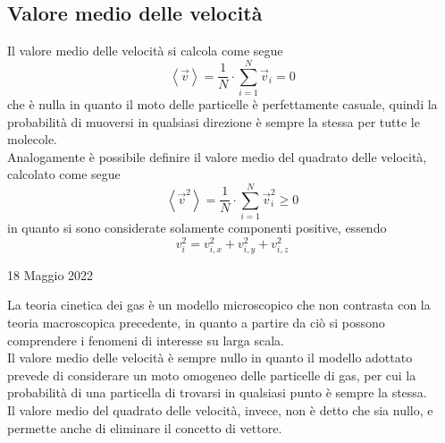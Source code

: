 \documentclass[a4paper]{extarticle}
\begin{document}
\vspace{1em}
\subsection{Valore medio delle velocità}
Il valore medio delle velocità si calcola come segue
\[\boxed{\left<\vec v\right> = \frac{1}{N} \cdot \sum_{i=1}^N \vec v_i = 0}\]
che è nulla in quanto il moto delle particelle è perfettamente casuale, quindi la probabilità di muoversi in qualsiasi direzione è sempre la stessa per tutte le molecole.\\
Analogamente è possibile definire il valore medio del quadrato delle velocità, calcolato come segue
\[\boxed{\left<\vec v^2\right> = \frac{1}{N} \cdot \sum_{i=1}^N \vec v_i^2 \geq 0}\]
in quanto si sono considerate solamente componenti positive, essendo
\[v_i^2 = v_{i,x}^2 + v_{i,y}^2 + v_{i,z}^2\]

\newpage
\noindent
\begin{center}
  18 Maggio 2022
\end{center}
La teoria cinetica dei gas è un modello microscopico che non contrasta con la teoria macroscopica precedente, in quanto a partire da ciò si possono comprendere i fenomeni di interesse su larga scala.\\
Il valore medio delle velocità è sempre nullo in quanto il modello adottato prevede di considerare un moto omogeneo delle particelle di gas, per cui la probabilità di una particella di trovarsi in qualsiasi punto è sempre la stessa.\\
Il valore medio del quadrato delle velocità, invece, non è detto che sia nullo, e permette anche di eliminare il concetto di vettore.

\vspace{1em}
\end{document}
